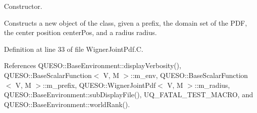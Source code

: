 Constructor. 

Constructs a new object of the class, given a prefix, the domain set of the P\-D\-F, the center position {\ttfamily center\-Pos}, and a radius {\ttfamily radius}. 

Definition at line 33 of file Wigner\-Joint\-Pdf.\-C.



References Q\-U\-E\-S\-O\-::\-Base\-Environment\-::display\-Verbosity(), Q\-U\-E\-S\-O\-::\-Base\-Scalar\-Function$<$ V, M $>$\-::m\-\_\-env, Q\-U\-E\-S\-O\-::\-Base\-Scalar\-Function$<$ V, M $>$\-::m\-\_\-prefix, Q\-U\-E\-S\-O\-::\-Wigner\-Joint\-Pdf$<$ V, M $>$\-::m\-\_\-radius, Q\-U\-E\-S\-O\-::\-Base\-Environment\-::sub\-Display\-File(), U\-Q\-\_\-\-F\-A\-T\-A\-L\-\_\-\-T\-E\-S\-T\-\_\-\-M\-A\-C\-R\-O, and Q\-U\-E\-S\-O\-::\-Base\-Environment\-::world\-Rank().


